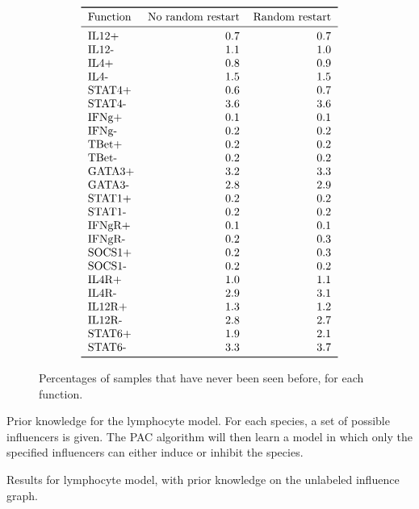 \documentclass{llncs}
\begin{document}
\begin{figure}[htbp]
	\[
\begin{tabular}{lrr}
\toprule
Function &  No random restart &      Random restart \\
\midrule
IL12+    &   0.7 &   0.7 \\
IL12-    &   1.1 &   1.0 \\
IL4+     &   0.8 &   0.9 \\
IL4-     &   1.5 &   1.5 \\
STAT4+   &   0.6 &   0.7 \\
STAT4-   &   3.6 &   3.6 \\
IFNg+    &   0.1 &   0.1 \\
IFNg-    &   0.2 &   0.2 \\
TBet+    &   0.2 &   0.2 \\
TBet-    &   0.2 &   0.2 \\
GATA3+   &   3.2 &   3.3 \\
GATA3-   &   2.8 &   2.9 \\
STAT1+   &   0.2 &   0.2 \\
STAT1-   &   0.2 &   0.2 \\
IFNgR+   &   0.1 &   0.1 \\
IFNgR-   &   0.2 &   0.3 \\
SOCS1+   &   0.2 &   0.3 \\
SOCS1-   &   0.2 &   0.2 \\
IL4R+    &   1.0 &   1.1 \\
IL4R-    &   2.9 &   3.1 \\
IL12R+   &   1.3 &   1.2 \\
IL12R-   &   2.8 &   2.7 \\
STAT6+   &   1.9 &   2.1 \\
STAT6-   &   3.3 &   3.7 \\
\bottomrule
\end{tabular}
	\]
	\caption{Percentages of samples that have never been seen before, for each function.\label{eff-samp}}
\end{figure}

\begin{listfig}[htb]
	
	\caption{Prior knowledge for the lymphocyte model. For each species, a set of possible influencers is given. The PAC algorithm will then learn a model in which only the specified influencers can either induce or inhibit the species.\label{hints}}
\end{listfig}



\begin{listfig}
	
	\caption{Results for lymphocyte model, with prior knowledge on the unlabeled influence graph.\label{hints.res}}
\end{listfig}
\end{document}
